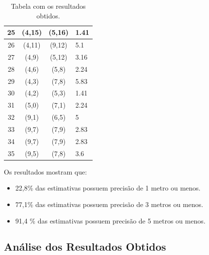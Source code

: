 \begin{table}[h]
\begin{center}
{\begin{minipage}{\textwidth}
\begin{tabular}{| c | c | c | p{3cm} |}
	    25 & (4,15) & (5,16) & 1.41 \\ \hline
	    26 & (4,11) & (9,12) & 5.1 \\ \hline
	    27 & (4,9) & (5,12) & 3.16 \\ \hline
	    28 & (4,6) & (5,8) & 2.24 \\ \hline
	    29 & (4,3) & (7,8) & 5.83 \\ \hline
	    30 & (4,2) & (5,3) & 1.41 \\ \hline
	    31 & (5,0) & (7,1) & 2.24 \\ \hline
	    32 & (9,1) & (6,5) & 5 \\ \hline
	    33 & (9,7) & (7,9) & 2.83 \\ \hline
	    34 & (9,7) & (7,9) & 2.83 \\ \hline 
	    35 & (9,5) & (7,8) & 3.6 \\ \hline 
	 \end{tabular}
	 \caption[Table caption text]{Tabela com os  resultados obtidos. }
	 \label{table:name}
	 
	\end{minipage} }
		 \end{center}
     \end{table}
     
      Os resultados mostram que:
     
     \begin{itemize}
      \item 22,8\% das estimativas possuem precisão de 1 metro ou menos.
      \item 77,1\% das estimativas possuem precisão de 3 metros ou menos.
      \item 91,4 \% das estimativas possuem precisão de 5 metros ou menos.
     \end{itemize}
     \clearpage
     \subsection{Análise dos Resultados Obtidos}
      
